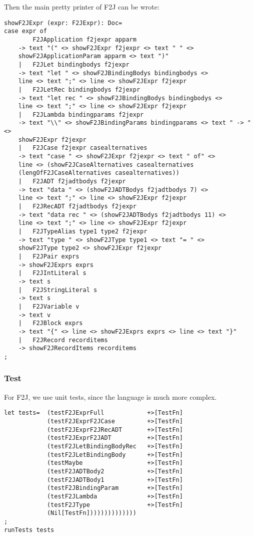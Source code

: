 Then the main pretty printer of F2J can be wrote:
\begin{lstlisting}
showF2JExpr (expr: F2JExpr): Doc=
case expr of
        F2JApplication f2jexpr apparm
    -> text "(" <> showF2JExpr f2jexpr <> text " " <>
    showF2JApplicationParam apparm <> text ")"
    |   F2JLet bindingbodys f2jexpr
    -> text "let " <> showF2JBindingBodys bindingbodys <>
    line <> text ";" <> line <> showF2JExpr f2jexpr
    |   F2JLetRec bindingbodys f2jexpr
    -> text "let rec " <> showF2JBindingBodys bindingbodys <>
    line <> text ";" <> line <> showF2JExpr f2jexpr
    |   F2JLambda bindingparams f2jexpr
    -> text "\\" <> showF2JBindingParams bindingparams <> text " -> " <>
    showF2JExpr f2jexpr
    |   F2JCase f2jexpr casealternatives
    -> text "case " <> showF2JExpr f2jexpr <> text " of" <>
    line <> (showF2JCaseAlternatives casealternatives
    (lengOfF2JCaseAlternatives casealternatives))
    |   F2JADT f2jadtbodys f2jexpr
    -> text "data " <> (showF2JADTBodys f2jadtbodys 7) <>
    line <> text ";" <> line <> showF2JExpr f2jexpr
    |   F2JRecADT f2jadtbodys f2jexpr
    -> text "data rec " <> (showF2JADTBodys f2jadtbodys 11) <>
    line <> text ";" <> line <> showF2JExpr f2jexpr
    |   F2JTypeAlias type1 type2 f2jexpr
    -> text "type " <> showF2JType type1 <> text "= " <>
    showF2JType type2 <> showF2JExpr f2jexpr
    |   F2JPair exprs
    -> showF2JExprs exprs
    |   F2JIntLiteral s
    -> text s
    |   F2JStringLiteral s
    -> text s
    |   F2JVariable v
    -> text v
    |   F2JBlock exprs
    -> text "{" <> line <> showF2JExprs exprs <> line <> text "}"
    |   F2JRecord recorditems
    -> showF2JRecordItems recorditems
;
\end{lstlisting}

\subsubsection{Test}

For F2J, we use unit tests, since the language is much more complex.

\begin{lstlisting}
let tests=  (testF2JExprFull            +>[TestFn]
            (testF2JExprF2JCase         +>[TestFn]
            (testF2JExprF2JRecADT       +>[TestFn]
            (testF2JExprF2JADT          +>[TestFn]
            (testF2JLetBindingBodyRec   +>[TestFn]
            (testF2JLetBindingBody      +>[TestFn]
            (testMaybe                  +>[TestFn]
            (testF2JADTBody2            +>[TestFn]
            (testF2JADTBody1            +>[TestFn]
            (testF2JBindingParam        +>[TestFn]
            (testF2JLambda              +>[TestFn]
            (testF2JType                +>[TestFn]
            (Nil[TestFn])))))))))))))
;
runTests tests
\end{lstlisting}

